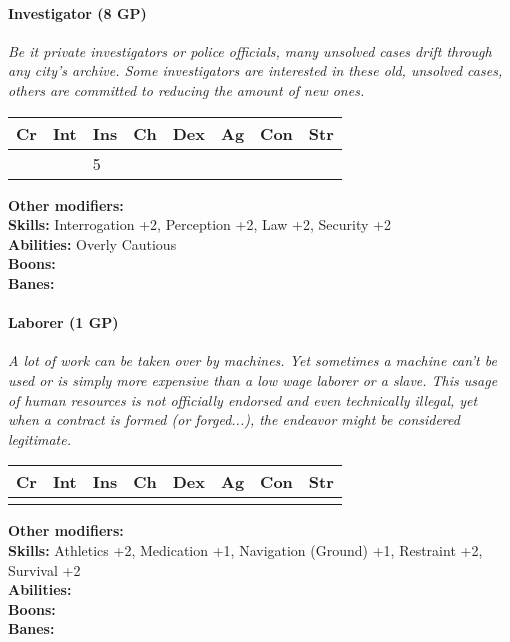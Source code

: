 \paragraph*{Investigator (8 GP)}
\textit{Be it private investigators or police officials, many unsolved cases drift through any city's archive. Some investigators are interested in these old, unsolved cases, others are committed to reducing the amount of new ones.}\par
\begin{tabular}{|l|l|l|l|l|l|l|l|}
	\hline
	Cr & Int & Ins & Ch & Dex & Ag & Con & Str \\ \hline
	&  & 5 &  &  &  &  &  \\ \hline
\end{tabular}\par
\noindent\textbf{Other modifiers:} \\
\textbf{Skills:} Interrogation +2,
Perception +2,
Law +2,
Security +2\\
\textbf{Abilities:} Overly Cautious\\
\textbf{Boons:} \\
\textbf{Banes:} \\

\hrulefill
\paragraph*{Laborer (1 GP)}
\textit{A lot of work can be taken over by machines. Yet sometimes a machine can't be used or is simply more expensive than a low wage laborer or a slave. This usage of human resources is not officially endorsed and even technically illegal, yet when a contract is formed (or forged...), the endeavor might be considered legitimate.}\par
\begin{tabular}{|l|l|l|l|l|l|l|l|}
	\hline
	Cr & Int & Ins & Ch & Dex & Ag & Con & Str \\ \hline
	&  &  &  &  &  &  &  \\ \hline
\end{tabular}\par
\noindent\textbf{Other modifiers:} \\
\textbf{Skills:} Athletics +2,
Medication +1,
Navigation (Ground) +1,
Restraint +2,
Survival +2\\
\textbf{Abilities:} \\
\textbf{Boons:} \\
\textbf{Banes:} \\

